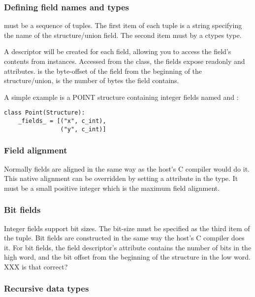 \subsubsection{Defining field names and types\label{ctypes-defining-field-names-types}}

 must be a sequence of tuples.  The first item of each
tuple is a string specifying the name of the structure/union field.
The second item must by a ctypes type.

A descriptor will be created for each field, allowing you to access the
field's contents from instances.  Accessed from the class, the fields
expose readonly  and  attributes.   is
the byte-offset of the field from the beginning of the
structure/union,  is the number of bytes the field contains.

A simple example is a POINT structure containing integer fields named
 and :
\begin{verbatim}
class Point(Structure):
    _fields_ = [("x", c_int),
                ("y", c_int)]
\end{verbatim}


\subsubsection{Field alignment\label{ctypes-field-alignment}}

Normally fields are aligned in the same way as the host's C compiler
would do it.  This native alignment can be overridden by setting a
 attribute in the type.  It must be a small positive integer
which is the maximum field alignment.


\subsubsection{Bit fields\label{ctypes-bit-fields}}

Integer fields support bit sizes.  The bit-size must be specified as
the third item of the  tuple.  Bit fields are constructed
in the same way the host's C compiler does it.  For bit fields, the
field descriptor's  attribute contains the number of bits in
the high word, and the bit offset from the beginning of the structure in
the low word.  XXX is that correct?


\subsubsection{Recursive data types\label{ctypes-recursive-data-types}}


